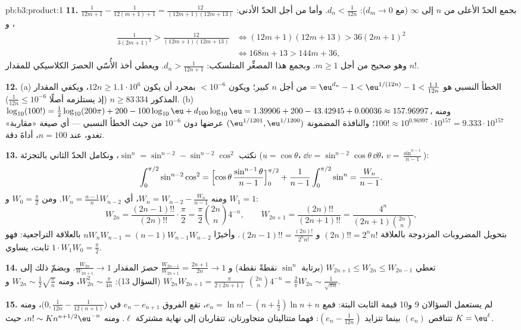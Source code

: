 \begin{solution}{pb:b3:product:1}
\textbf{11.} بجمع الحدّ الأعلى من $n$ إلى $\infty$
(مع $d_m \to 0$): $d_n < \frac1{12n}$. وأما من أجل الحدّ الأدنى:
$\frac1{12m+1} - \frac1{12(m+1)+1} =
\frac{12}{(12m+1)(12m+13)}$، و
\begin{align*}
\frac1{3(2m+1)^2} > \frac{12}{(12m+1)(12m+13)}
&\iff (12m+1)(12m+13) > 36(2m+1)^2 \\
&\iff 168m + 13 > 144m + 36,
\end{align*}
وهو صحيح من أجل $m \geq 1$. وبجمع هذا المصغِّر المتلسكب:
$d_n > \frac1{12n+1}$. ويعطي أخذ الأُسّي الحصرَ الكلاسيكي للمقدار $n!$.

\textbf{12.} (a) الخطأ النسبي هو $= \eu^{d_n} - 1 <
\eu^{1/(12n)} - 1 < \frac{1.1}{12n}$ من أجل $n$ كبير؛
ويكون $<
10^{-6}$ بمجرد أن يكون $12n \geq 1.1\cdot10^6$، ويكفي المقدار المذكور
$n \geq 83\,334$ (إذ يستلزمه أصلًا $\frac1{12n} \leq 10^{-6}$). (b) $\log_{10}(100!) =
\frac12\log_{10}(200\pi) + 200 - 100\log_{10}\eu +
d_{100}\log_{10}\eu = 1.39906 + 200 - 43.42945 + 0.00036
\approx 157.96997$،
ومنه $100! \approx 10^{0.96997} \cdot
10^{157} = 9.333\cdot10^{157}$؛ والنافذة المضمونة
$(\eu^{1/1201}, \eu^{1/1200})$ عرضها دون $10^{-6}$ من حيث الخطأ النسبي --- أي صيغة
«مقاربة» تغدو، عند $n =
100$، أداةَ دقة.

\textbf{13.} نكتب $\sin^n = \sin^{n-2} - \sin^{n-2}\cos^2$،
ونكامل الحدّ الثاني بالتجزئة ($u = \cos\theta$،
$\dd v = \sin^{n-2}\cos\theta\,\dd\theta$، $v =
\frac{\sin^{n-1}}{n-1}$):
\[
\int_0^{\pi/2}\sin^{n-2}\cos^2 =
\Bigl[\cos\theta\,\frac{\sin^{n-1}\theta}{n-1}\Bigr]_0^{\pi/2}
+ \frac1{n-1}\int_0^{\pi/2}\sin^n = \frac{W_n}{n-1} .
\]
ومنه $W_n = W_{n-2} - \frac{W_n}{n-1}$، أي $W_n =
\frac{n-1}nW_{n-2}$. ومن $W_0 = \frac\pi2$ و $W_1 = 1$:
\[
W_{2n} = \frac{(2n-1)!!}{(2n)!!}\cdot\frac\pi2
= \frac\pi2\binom{2n}n4^{-n},
\qquad
W_{2n+1} = \frac{(2n)!!}{(2n+1)!!}
= \frac{4^n}{(2n+1)\binom{2n}n},
\]
بتحويل المضروبات المزدوجة بالعلاقة $(2n)!! = 2^nn!$ و
$(2n-1)!! = \frac{(2n)!}{2^nn!}$. وأخيرًا $nW_nW_{n-1} =
(n-1)W_{n-1}W_{n-2}$ بالعلاقة التراجعية: فهو ثابت، يساوي
$1\cdot W_1W_0 = \frac\pi2$.

\textbf{14.} تعطي $W_{2n+1} \leq W_{2n} \leq W_{2n-1}$ (برتابة $\sin^n$ نقطةً نقطة) و
$\frac{W_{2n-1}}{W_{2n+1}} =
\frac{2n+1}{2n} \to 1$ حصرَ المقدار $\frac{W_{2n}}{W_{2n+1}} \to
1$. وبضمّ ذلك إلى $W_{2n}W_{2n+1} = \frac{\pi}{2(2n+1)}$
(السؤال 13): $W_{2n}^2 \sim \frac\pi{4n}$، ومنه $W_{2n} \sim
\frac12\sqrt{\frac\pi n}$ و $\binom{2n}n4^{-n} =
\frac2\pi W_{2n} \sim \frac1{\sqrt{\pi n}}$.

\textbf{15.} لم يستعمل السؤالان 9 و10 قيمة الثابت البتة: فمع
$e_n = \ln n! - (n+\frac12)\ln n + n$، تقع الفروق $e_n - e_{n+1}$ في
$\bigl(0, \frac1{12n} -
\frac1{12(n+1)}\bigr)$، ومنه تتناقص $(e_n)$ بينما تتزايد $(e_n -
\frac1{12n})$: فهما
متتاليتان متجاورتان، تتقاربان إلى نهاية مشتركة $\ell$. ومنه
$n! \sim K n^{n+1/2}\eu^{-n}$، حيث $K =
\eu^\ell$.


\end{solution}
